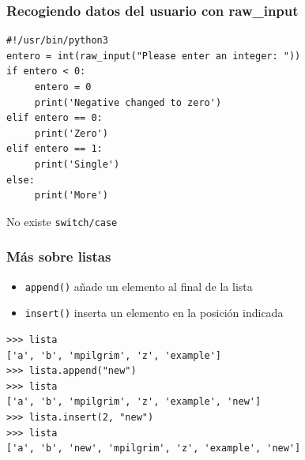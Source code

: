 \documentclass{beamer}
\begin{document}
%





\begin{frame}[fragile]
\frametitle{Recogiendo datos del usuario con raw\_input}

\begin{footnotesize}
\begin{verbatim}
#!/usr/bin/python3
entero = int(raw_input("Please enter an integer: "))
if entero < 0:
     entero = 0
     print('Negative changed to zero')
elif entero == 0:
     print('Zero')
elif entero == 1:
     print('Single')
else:
     print('More')
\end{verbatim}
\end{footnotesize}
  

No existe \verb|switch/case|
\end{frame}














\begin{frame}[fragile]
\frametitle{Más sobre listas}

\begin{itemize}
\item \verb|append()| añade un elemento al final de la lista
\item \verb|insert()| inserta un elemento en la posición indicada
\end{itemize}  

\begin{footnotesize}
\begin{verbatim}
>>> lista
['a', 'b', 'mpilgrim', 'z', 'example']
>>> lista.append("new")               
>>> lista
['a', 'b', 'mpilgrim', 'z', 'example', 'new']
>>> lista.insert(2, "new")           
>>> lista
['a', 'b', 'new', 'mpilgrim', 'z', 'example', 'new']
\end{verbatim}
\end{footnotesize}


\end{frame}
\end{document}
